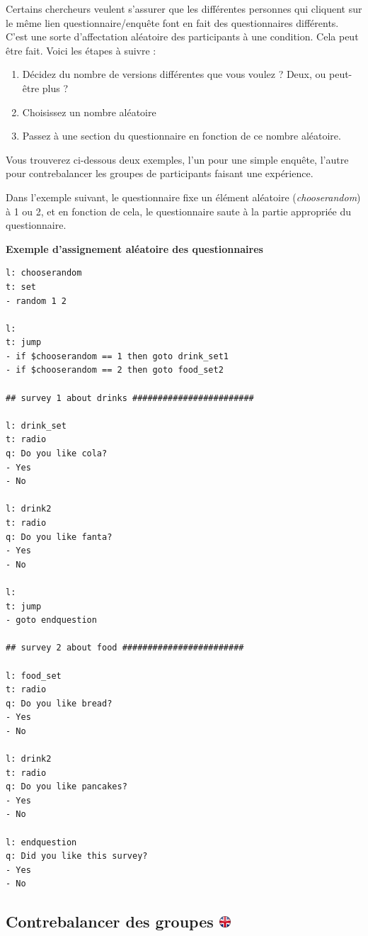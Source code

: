 \documentclass[
]{book}
\providecommand{\tightlist}{%
  \setlength{\itemsep}{0pt}\setlength{\parskip}{0pt}}
\begin{document}
Certains chercheurs veulent s'assurer que les différentes personnes qui cliquent sur le même lien questionnaire/enquête font en fait des questionnaires différents. C'est une sorte d'affectation aléatoire des participants à une condition. Cela peut être fait. Voici les étapes à suivre :

\begin{enumerate}
\def\labelenumi{\arabic{enumi}.}
\tightlist
\item
  Décidez du nombre de versions différentes que vous voulez ? Deux, ou peut-être plus ?
\item
  Choisissez un nombre aléatoire
\item
  Passez à une section du questionnaire en fonction de ce nombre aléatoire.
\end{enumerate}

Vous trouverez ci-dessous deux exemples, l'un pour une simple enquête, l'autre pour contrebalancer les groupes de participants faisant une expérience.

Dans l'exemple suivant, le questionnaire fixe un élément aléatoire (\emph{chooserandom}) à 1 ou 2, et en fonction de cela, le questionnaire saute à la partie appropriée du questionnaire.

\textbf{Exemple d'assignement aléatoire des questionnaires}

\begin{verbatim}
l: chooserandom
t: set
- random 1 2

l:
t: jump
- if $chooserandom == 1 then goto drink_set1
- if $chooserandom == 2 then goto food_set2

## survey 1 about drinks ########################

l: drink_set
t: radio
q: Do you like cola?
- Yes
- No

l: drink2
t: radio
q: Do you like fanta?
- Yes
- No

l:
t: jump
- goto endquestion

## survey 2 about food ########################

l: food_set
t: radio
q: Do you like bread?
- Yes
- No

l: drink2
t: radio
q: Do you like pancakes?
- Yes
- No

l: endquestion
q: Did you like this survey?
- Yes
- No
\end{verbatim}

\hypertarget{contrebalancer-des-groupes}{%
\subsection[Contrebalancer des groupes ]{\texorpdfstring{Contrebalancer des groupes \href{https://www.psytoolkit.org/doc3.4.0/online-survey-syntax.html\#counterbalancing}{\protect\includegraphics{img/ukflag.png}}}{Contrebalancer des groupes }}\label{contrebalancer-des-groupes}}
\end{document}
